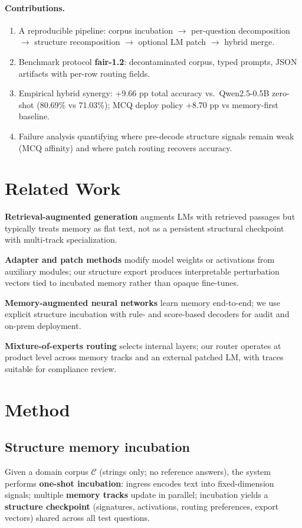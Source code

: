 \documentclass[11pt,a4paper]{article}
\begin{document}
\paragraph{Contributions.}
\begin{enumerate}
  \item A reproducible pipeline: corpus incubation $\rightarrow$ per-question decomposition $\rightarrow$ structure recomposition $\rightarrow$ optional LM patch $\rightarrow$ hybrid merge.
  \item Benchmark protocol \textbf{fair-1.2}: decontaminated corpus, typed prompts, JSON artifacts with per-row routing fields.
  \item Empirical hybrid synergy: +9.66 pp total accuracy vs.\ Qwen2.5-0.5B zero-shot (80.69\% vs 71.03\%); MCQ deploy policy +8.70 pp vs memory-first baseline.
  \item Failure analysis quantifying where pre-decode structure signals remain weak (MCQ affinity) and where patch routing recovers accuracy.
\end{enumerate}

\section{Related Work}
\textbf{Retrieval-augmented generation} augments LMs with retrieved passages but typically treats memory as flat text, not as a persistent structural checkpoint with multi-track specialization.

\textbf{Adapter and patch methods} modify model weights or activations from auxiliary modules; our structure export produces interpretable perturbation vectors tied to incubated memory rather than opaque fine-tunes.

\textbf{Memory-augmented neural networks} learn memory end-to-end; we use explicit structure incubation with rule- and score-based decoders for audit and on-prem deployment.

\textbf{Mixture-of-experts routing} selects internal layers; our router operates at product level across memory tracks and an external patched LM, with traces suitable for compliance review.

\section{Method}

\subsection{Structure memory incubation}
Given a domain corpus $\mathcal{C}$ (strings only; no reference answers), the system performs \textbf{one-shot incubation}: ingress encodes text into fixed-dimension signals; multiple \textbf{memory tracks} update in parallel; incubation yields a \textbf{structure checkpoint} (signatures, activations, routing preferences, export vectors) shared across all test questions.
\end{document}
